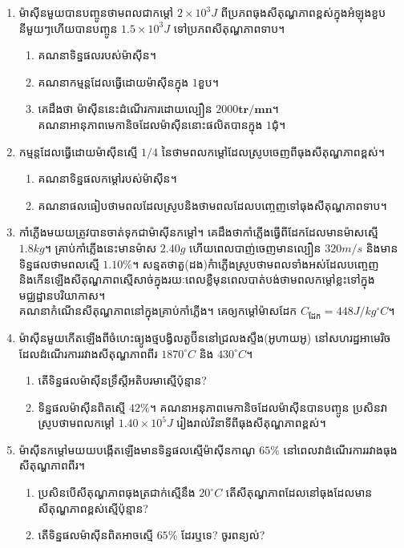 \begin{enumerate}
		\item ម៉ាសុីនមួយបានបញ្ចូនថាមពលជាកម្តៅ $2\times10^{3}J$ ពីប្រភពធុងសីតុណ្ហភាពខ្ពស់ក្នុងអំឡុងខួបនីមួយៗហើយបានបញ្ចូន $1.5\times10^{3}J$ ទៅប្រភពសីតុណ្ហភាពទាប។
		\begin{enumerate}
			\item គណនាទិន្នផលរបស់ម៉ាសុីន។
			\item គណនាកម្មន្តដែលធ្វើដោយម៉ាសុីនក្នុង $1$ខួប។
			\item គេដឹងថា ម៉ាសុីននេះដំណើរការដោយល្បឿន $2000\mathbf{tr/mn}$។\\
			គណនាអានុភាពមេកានិចដែលម៉ាសុីននោះផលិតបានក្នុង $1$ជុំ។
		\end{enumerate}
		\item កម្មន្តដែលធ្វើដោយម៉ាសុីនស្មើ $1/4$ នៃថាមពលកម្តៅដែលស្រូបចេញពីធុងសីតុណ្ហភាពខ្ពស់។
		\begin{enumerate}
			\item គណនាទិន្នផលកម្តៅរបស់ម៉ាសុីន។
			\item គណនាផលធៀបថាមពលដែលស្រូបនិងថាមពលដែលបញ្ចេញទៅធុងសីតុណ្ហភាពទាប។
		\end{enumerate}
		\item កាំភ្លើងមយយត្រូវបានចាត់ទុកជាម៉ាសុីនកម្តៅ។ គេដឹងថាកាំភ្លើងធ្វើពីដែកដែលមានម៉ាសស្មើ $1.8kg$។ គ្រាប់កាំភ្លើងនេះមានម៉ាស $2.40g$ ហើយពេលបាញ់ចេញមានល្បឿន $320m/s$ និងមានទិន្នផលថាមពលស្មើ $1.10\%$។ សន្មតថាតួ(ដង)កំាភ្លើងស្រូបថាមពលទាំងអស់ដែលបញ្ចេញនិងកើនឡើងសីតុណ្ហភាពស្មើសាច់ក្នុងរយៈពេលខ្លឺមុនពេលបាត់បង់ថាមពលកម្តៅខ្លះទៅក្នុងមជ្ឈដ្ឋានបរិយាកាស។\\ គណនាកំណើនសីតុណ្ហភាពនៅក្នុងគ្រាប់កាំភ្លើង។ គេឲ្យកម្តៅម៉ាសដែក $C_{\text{ដែក}}=448J/kg^{\circ}C$។
		\item ម៉ាសុីនមួយកើតឡើងពីចំហេះធ្យូងថ្មបង្វិលតួប៊ីននៅជ្រលងស្ទឹង(អូហាយអូ) នៅសហរដ្ឋអាមេរិចដែលដំណើរការរវាងសីតុណ្ហភាពពីរ $1870^\circ C$ និង $430^\circ C$។
		\begin{enumerate}
			\item តើទិន្នផលម៉ាសុីនទ្រឹស្តីអតិបរមាស្មើប៉ុន្មាន?
			\item ទិន្នផលម៉ាសុីនពិតស្មើ $42\%$។ គណនាអនុភាពមេកានិចដែលម៉ាសុីនបានបញ្ចូន ប្រសិនវាស្រូបថាមពលកម្តៅ $1.40\times10^{5}J$ រៀងរាល់វិនាទីពីធុងសីតុណ្ហភាពខ្ពស់។
		\end{enumerate}
		\item ម៉ាសុីនកម្តៅមយយបង្កើតឡើងមានទិន្នផលស្មើម៉ាសុីនកាណូ $65\%$ នៅពេលវាដំណើរការរវាងធុងសីតុណ្ហភាពពីរ។
		\begin{enumerate}
			\item ប្រសិនបើសីតុណ្ហភាពធុងត្រជាក់ស្មើនឹង $20^\circ C$ តើសីតុណ្ហភាពដែលនៅធុងដែលមានសីតុណ្ហភាពខ្ពស់ស្មើប៉ុន្មាន?
			\item តើទិន្នផលម៉ាសុីនពិតអាចស្មើ $65\%$ ដែរឬទេ? ចូរពន្យល់?

\end{enumerate}
\end{enumerate}
